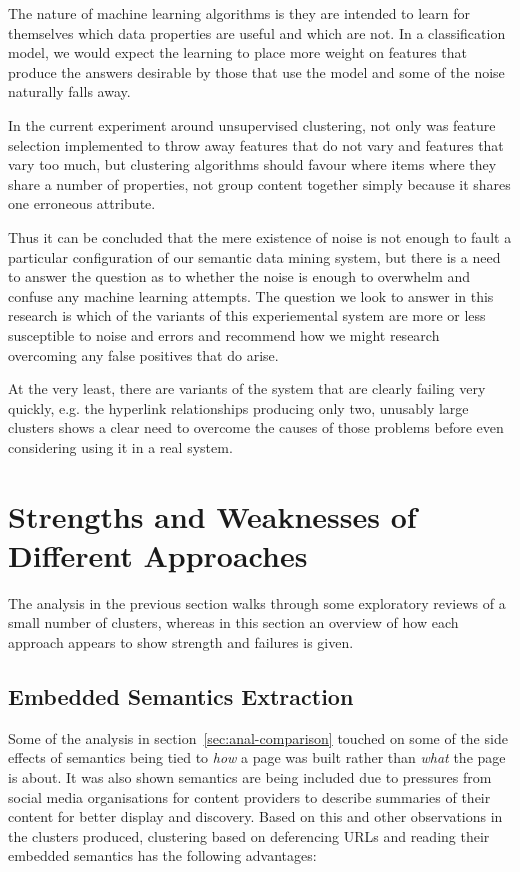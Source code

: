 The nature of machine learning algorithms is they are intended to
learn for themselves which data properties are useful and which are
not. In a classification model, we would expect the learning to
place more weight on features that produce the answers desirable
by those that use the model and some of the noise naturally falls
away.

In the current experiment around unsupervised clustering, not only
was feature selection implemented to throw away features that do not
vary and features that vary too much, but clustering algorithms
should favour where items where they share a number of properties, not
group content together simply because it shares one erroneous
attribute.

Thus it can be concluded that the mere existence of noise is not
enough to fault a particular configuration of our semantic data mining
system, but there is a need to answer the question as to whether the
noise is enough to overwhelm and confuse any machine learning
attempts. The question we look to answer in this research is which
of the variants of this experiemental system are more or less
susceptible to noise and errors and recommend how we might research
overcoming any false positives that do arise.

At the very least, there are variants of the system that are clearly
failing very quickly, e.g. the hyperlink relationships producing only
two, unusably large clusters shows a clear need to overcome the causes
of those problems before even considering using it in a real system.

\section{Strengths and Weaknesses of Different Approaches}

The analysis in the previous section walks through some exploratory
reviews of a small number of clusters, whereas in this section an
overview of how each approach appears to show strength and failures
is given.

\subsection{Embedded Semantics Extraction}
\label{sec:anal-deref}

Some of the analysis in section~\ref{sec:anal-comparison} touched on
some of the side effects of semantics being tied to \emph{how} a page
was built rather than \emph{what} the page is about. It was also
shown semantics are being included due to  pressures from social media
organisations for content
providers to describe summaries of their content for better display
and discovery. Based on this and other observations in the clusters
produced, clustering based on deferencing URLs and reading their
embedded semantics has the following advantages:

